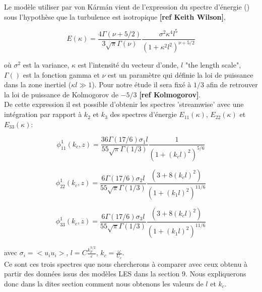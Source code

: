 \documentclass[12pt]{article}
\theoremstyle{plain}
\theoremstyle{remark}
\begin{document}
	Le modèle utiliser par von Kármán vient de l'expression du spectre d'énergie () sous l'hypothèse que la turbulence est isotropique \textbf{[\color{blue}ref Keith Wilson]},
	
	\begin{equation}
		E(\kappa) = \frac{4\Gamma(\nu + 5/2)}{3\sqrt{\pi}\Gamma(\nu)}\frac{\sigma^2\kappa^4l^5}{(1+\kappa^2l^2)^{\nu + 5/2}}
		\label{energie_spectra}
	\end{equation}

	où $\sigma^2$ est la variance, $\kappa$ est l'intensité du vecteur d'onde, $l$ "the length scale", $\Gamma()$ est la fonction gamma et $\nu$ est un paramètre qui définie la loi de puissance dans la zone inertiel ($\kappa l \gg 1$). Pour notre étude il sera fixé à $1/3$ afin de retrouver la loi de puissance de Kolmogorov de $-5/3$ \textbf{[\color{blue}ref Kolmogorov]}. \\

	De cette expression il est possible d'obtenir les spectres 'streamwise' avec une intégration par rapport à $k_2$ et $k_3$ des spectres d'énergie $E_{11}(\kappa)$, $E_{22}(\kappa)$ et $E_{33}(\kappa)$:
	
	\begin{equation}
		\phi_{11}^1(k_c,z) = \frac{36\Gamma(17/6)\sigma_1l}{55\sqrt{\pi}\Gamma(1/3)}\frac{1}{(1 + (k_cl)^2)^{5/6}}
		\label{eq:phi_vk_1}
	\end{equation}

	\begin{equation}
		\phi_{22}^1(k_c,z) = \frac{6\Gamma(17/6)\sigma_2l}{55\sqrt{\pi}\Gamma(1/3)}\frac{(3+8(k_cl)^2)}{(1 + (k_1l)^2)^{11/6}}
		\label{eq:phi_vk_2}
	\end{equation}

	\begin{equation}
		\phi_{33}^1(k_c,z) = \frac{6\Gamma(17/6)\sigma_3l}{55\sqrt{\pi}\Gamma(1/3)}\frac{(3+8(k_cl)^2)}{(1 + (k_1l)^2)^{11/6}}
		\label{eq:phi_vk_3}
	\end{equation}

	avec $\sigma_i = <u_iu_i>$, $l=C\frac{k_T^{3/2}}{\varepsilon}$, $k_c = \frac{\omega}{U_c}$.\\
	
	Ce sont ces trois spectres que nous chercherons à comparer avec ceux obtenu à partir des données issus des modèles LES dans la section $9$. Nous expliquerons donc dans la dites section comment nous obtenons les valeurs de $l$ et $k_c$.
	
	
		 
\end{document}
